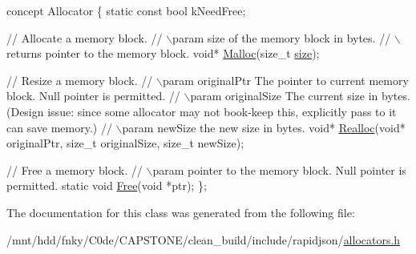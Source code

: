 \begin{DoxyCode}
concept Allocator \{
    \textcolor{keyword}{static} \textcolor{keyword}{const} \textcolor{keywordtype}{bool} kNeedFree;    

    \textcolor{comment}{// Allocate a memory block.}
    \textcolor{comment}{// \(\backslash\)param size of the memory block in bytes.}
    \textcolor{comment}{// \(\backslash\)returns pointer to the memory block.}
    \textcolor{keywordtype}{void}* \hyperlink{allocators_8h_ac93f7ec26fdae5fdb712b0cf43ffaf48}{Malloc}(\textcolor{keywordtype}{size\_t} \hyperlink{imgui__impl__opengl3__loader_8h_a3d1e3edfcf61ca2d831883e1afbad89e}{size});

    \textcolor{comment}{// Resize a memory block.}
    \textcolor{comment}{// \(\backslash\)param originalPtr The pointer to current memory block. Null pointer is permitted.}
    \textcolor{comment}{// \(\backslash\)param originalSize The current size in bytes. (Design issue: since some allocator may not book-keep
       this, explicitly pass to it can save memory.)}
    \textcolor{comment}{// \(\backslash\)param newSize the new size in bytes.}
    \textcolor{keywordtype}{void}* \hyperlink{allocators_8h_a0fb2bdf1591ab07b8251eebe71de4b19}{Realloc}(\textcolor{keywordtype}{void}* originalPtr, \textcolor{keywordtype}{size\_t} originalSize, \textcolor{keywordtype}{size\_t} newSize);

    \textcolor{comment}{// Free a memory block.}
    \textcolor{comment}{// \(\backslash\)param pointer to the memory block. Null pointer is permitted.}
    \textcolor{keyword}{static} \textcolor{keywordtype}{void} \hyperlink{allocators_8h_a471c182d62d396b7d5d564e8d6a62d9e}{Free}(\textcolor{keywordtype}{void} *ptr);
\};
\end{DoxyCode}
 

The documentation for this class was generated from the following file\+:\begin{DoxyCompactItemize}
\item 
/mnt/hdd/fnky/\+C0de/\+C\+A\+P\+S\+T\+O\+N\+E/clean\+\_\+build/include/rapidjson/\hyperlink{allocators_8h}{allocators.\+h}\end{DoxyCompactItemize}

